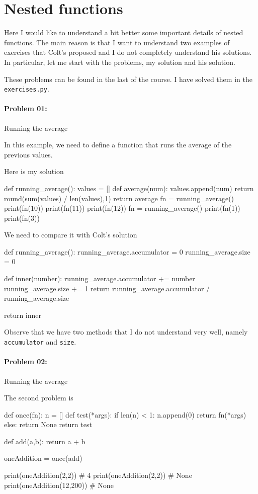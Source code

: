 \section{Nested functions}

Here I would like to understand a bit better some important details of nested functions. The main reason is that I want to understand two examples of exercises that Colt's proposed and I do not completely understand his solutions. In particular, let me start with the problems, my solution and his solution. 

These problems can be found in the last of the course. I have solved them in the \verb|exercises.py|.

\paragraph{\bf Problem 01:} Running the average

In this example, we need to define a function that runs the average of the previous values.

Here is my solution
\begin{listing}{1}
    def running_average():
        values = []
        def average(num):
                values.append(num)
                return round(sum(values) / len(values),1)
        return average
fn = running_average()        
print(fn(10))
print(fn(11))
print(fn(12))
fn = running_average()        
print(fn(1))
print(fn(3))
\end{listing}	

We need to compare it with Colt's solution 
\begin{listing}{1}
def running_average():
    running_average.accumulator = 0
    running_average.size = 0

    def inner(number):
        running_average.accumulator += number
        running_average.size += 1
        return running_average.accumulator / running_average.size

    return inner    
\end{listing}

Observe that we have two methods that I do not understand very well, namely \verb|accumulator| and \verb|size|.

\paragraph{\bf Problem 02:} Running the average

The second problem is 
\begin{listing}{1}
def once(fn):
    n = []
    def test(*args):
            if len(n) < 1:
                    n.append(0)
                    return fn(*args)
            else:
                    return None
    return test

def add(a,b):
    return a + b

oneAddition = once(add)

print(oneAddition(2,2)) # 4
print(oneAddition(2,2)) # None
print(oneAddition(12,200)) # None     
\end{listing}

